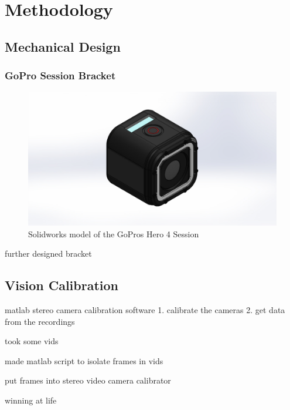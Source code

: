 \chapter{Methodology}

\section{Mechanical Design}

\subsection{GoPro Session Bracket}

\begin{figure}
  \includegraphics[width=\linewidth]{figures/GoProHero4Session.JPG}
  \caption{Solidworks model of the GoPros Hero 4 Session}
  \label{fig:goproherosession4}
\end{figure}

further designed bracket




\section{Vision Calibration}
matlab stereo camera calibration software
1. calibrate the cameras
2. get data from the recordings

took some vids

made matlab script to isolate frames in vids

put frames into stereo video camera calibrator

winning at life


